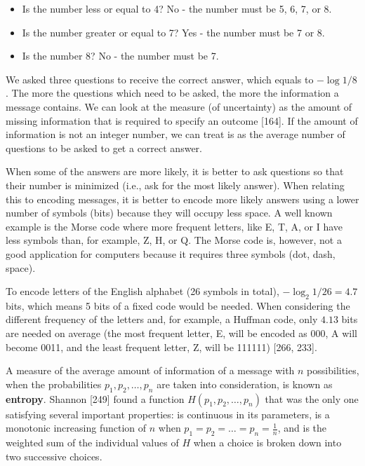 \documentclass[11pt,openany,executivepaper]{book}
\begin{document}
\begin{itemize}
    \item Is the number less or equal to 4? No - the number must be 5, 6, 7, or 8.
    \item Is the number greater or equal to 7? Yes - the number must be 7 or 8.
    \item Is the number 8? No - the number must be 7.
\end{itemize}

We asked three questions to receive the correct answer, which equals to
$-\log 1/8$. The more the questions which need to be asked, the more the information a message contains. We can look at the measure (of uncertainty) as the amount of missing information that is required to specify an outcome [164]. If the amount of information is not an integer number, we can treat is as the average number of questions to be asked to get a correct answer.

When some of the answers are more likely, it is better to ask questions so that their number is minimized (i.e., ask for the most likely answer). When relating this to encoding messages, it is better to encode more likely answers using a lower number of symbols (bits) because they will occupy less space. A well known example is the Morse code where more frequent letters, like E, T, A, or I have less symbols than, for example, Z, H, or Q. The Morse code is, however, not a good application for computers because it requires three symbols (dot, dash, space).
\begin{sloppypar}
  \raggedright
To encode letters of the English alphabet (26 symbols in total), $-\log_2 1/26 = 4.7$ bits, which means 5 bits of a fixed code would be needed. When considering the different frequency of the letters and, for example, a Huffman code, only $4.13$ bits are needed on average (the most frequent letter, E, will be encoded as 000, A will become 0011, and the least frequent letter, Z, will be 111111) [266, 233].
  
\end{sloppypar}

A measure of the average amount of information of a message with $n$ possibilities, when the probabilities $p_1, p_2, \dots, p_n$ are taken into consideration, is known as \textbf{entropy}. Shannon [249] found a function $H(p_1, p_2, \dots, p_n)$ that was the only one satisfying several important properties: is continuous in its parameters, is a monotonic increasing function of $n$ when $p_1 = p_2 = \dots = p_n = \frac{1}{n}$, and is the weighted sum of the individual values of $H$ when a choice is broken down into two successive choices.
\end{document}
